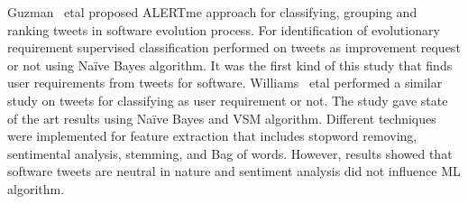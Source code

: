 % 
% 

Guzman ~etal \cite{Guzman:2017} proposed ALERTme approach for classifying,
grouping and ranking tweets in software evolution process. For identification of
evolutionary requirement supervised classification performed on tweets as
improvement request or not using Naïve Bayes algorithm. It was the first kind of
this study that finds user requirements from tweets for software. Williams ~etal
 \cite{Williams:2017} performed a similar study on
tweets for classifying as user requirement or not. The study gave state of the art results using Naïve Bayes
and VSM algorithm. Different techniques were implemented for feature extraction
that includes stopword removing, sentimental analysis, stemming, and Bag of words. However, results showed that
software tweets are neutral in nature and sentiment analysis did not influence ML algorithm.\\

